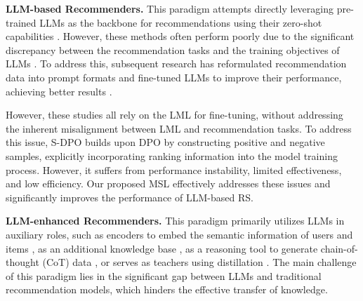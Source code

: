 \documentclass[sigconf,natbib=true]{acmart}
\begin{document}
\textbf{LLM-based Recommenders.} This paradigm attempts directly leveraging pre-trained LLMs as the backbone for recommendations using their zero-shot capabilities \cite{gao2023chat, hou2024large,liu2024once,wang2023zero,wang2024recommend}. However, these methods often perform poorly due to the significant discrepancy between the recommendation tasks and the training objectives of LLMs \cite{yang2024psl}. To address this, subsequent research has reformulated recommendation data into prompt formats and fine-tuned LLMs to improve their performance, achieving better results \cite{bao2023bi,bao2023tallrec,hu2024exact,li2023prompt, li2024citation,li2023exploring,li2024pap,shi2024enhancing,wang2024towards,zhang2023recommendation,zhang2024tired,gao2024end, lin2024bridging, xu2024slmrec, wang2023alt, wang2024enhanced, zhu2024collaborative}. 

However, these studies all rely on the LML for fine-tuning, without addressing the inherent misalignment between LML and recommendation tasks. To address this issue, S-DPO \cite{chen2024softmax} builds upon DPO \cite{rafailov2024direct} by constructing positive and negative samples, explicitly incorporating ranking information into the model training process. However, it suffers from performance instability, limited effectiveness, and low efficiency. Our proposed MSL effectively addresses these issues and significantly improves the performance of LLM-based RS.

\textbf{LLM-enhanced Recommenders.} This paradigm primarily utilizes LLMs in auxiliary roles, such as encoders to embed the semantic information of users and items \cite{xi2023towards, ren2024representation, wei2024llmrec, wang2023alt, lee2024star, ren2024enhancing, xu2024enhancing}, as an additional knowledge base \cite{yang2024common, qin2024d2k}, as a reasoning tool to generate chain-of-thought (CoT) data \cite{sun2024large, wang2024can}, or serves as teachers using distillation \cite{cui2024distillation, liu2024llm}. The main challenge of this paradigm lies in the significant gap between LLMs and traditional recommendation models, which hinders the effective transfer of knowledge.
\end{document}
